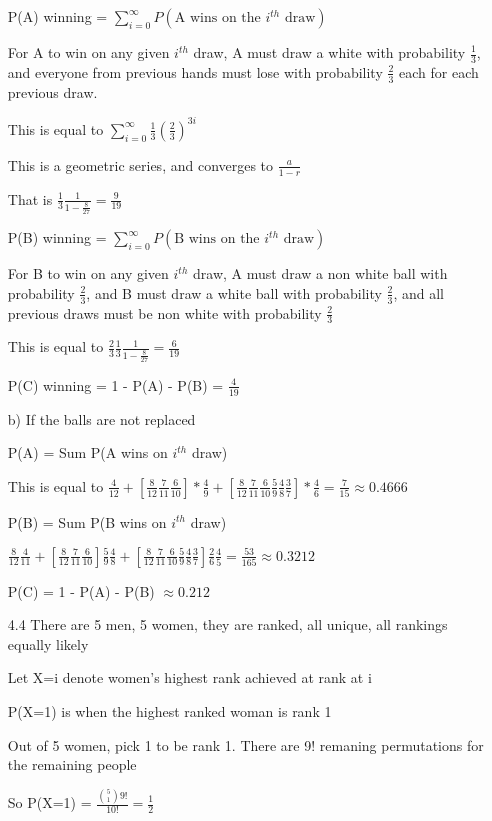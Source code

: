 \documentclass[11pt]{article}
\begin{document}
\begin{itemize}
  P(A) winning = $\sum_{i=0}^{\infty} P(\text{A wins on the $i^{th}$ draw})$

  For A to win on any given $i^{th}$ draw, A must draw a white with probability $\frac{1}{3}$, and everyone from previous hands must lose with probability $\frac{2}{3}$ each for each previous draw.

  This is equal to $\sum_{i=0}^{\infty} \frac{1}{3}(\frac{2}{3})^{3i}$

  This is a geometric series, and converges to $\frac{a}{1-r}$

  That is $\frac{1}{3} \frac{1}{1-\frac{8}{27}} = \frac{9}{19}$

  P(B) winning = $\sum_{i=0}^{\infty} P(\text{B wins on the $i^{th}$ draw})$

  For B to win on any given $i^{th}$ draw, A must draw a non white ball with probability $\frac{2}{3}$, and B must draw a white ball with probability $\frac{2}{3}$, and all previous draws must be non white with probability $\frac{2}{3}$

  This is equal to $\frac{2}{3}\frac{1}{3} \frac{1}{1-\frac{8}{27}} = \frac{6}{19}$

  P(C) winning = 1 - P(A) - P(B) = $\frac{4}{19}$

  b) If the balls are not replaced

  P(A) = Sum P(A wins on $i^{th}$ draw)

  This is equal to $\frac{4}{12} + [\frac{8}{12}\frac{7}{11}\frac{6}{10}]*\frac{4}{9} + [\frac{8}{12}\frac{7}{11}\frac{6}{10}\frac{5}{9}\frac{4}{8}\frac{3}{7}]*\frac{4}{6} = \frac{7}{15} \approx 0.4666$

  P(B) = Sum P(B wins on $i^{th}$ draw)

  $\frac{8}{12}\frac{4}{11} + [\frac{8}{12}\frac{7}{11}\frac{6}{10}]\frac{5}{9}\frac{4}{8} + [\frac{8}{12}\frac{7}{11}\frac{6}{10}\frac{5}{9}\frac{4}{8}\frac{3}{7}]\frac{2}{6}\frac{4}{5} = \frac{53}{165} \approx 0.3212$

  P(C) = 1 - P(A) - P(B) $\approx 0.212$
\item[4.4]
  There are 5 men, 5 women, they are ranked, all unique, all rankings equally likely

  Let X=i denote women's highest rank achieved at rank at i

  P(X=1) is when the highest ranked woman is rank 1

  Out of 5 women, pick 1 to be rank 1. There are 9! remaning permutations for the remaining people

  So P(X=1) = $\frac{\binom{5}{1} 9!}{10!} = \frac{1}{2}$


\end{itemize}
\end{document}
